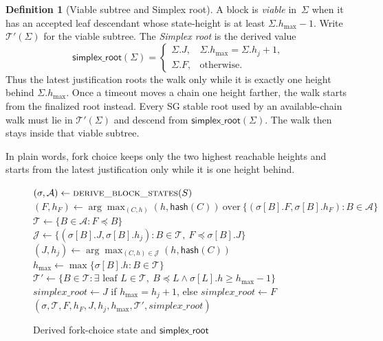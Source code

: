 \ifx\litemode\undefined\documentclass{article}\fi
\theoremstyle{plain}
\theoremstyle{definition}
\newtheorem{definition}{Definition}
\theoremstyle{remark}
\newcommand{\T}{\mathcal{T}}
\newcommand{\viableTree}{\mathcal{T}'}
\newcommand{\hmax}{h_{\max}}
\newcommand{\simplexRoot}{\mathsf{simplex\_root}}
\begin{document}
\begin{definition}[Viable subtree and Simplex root]\label{def:finality-root}
A block is \emph{viable} in~\(\Sigma\) when it has an accepted leaf descendant
whose state-height is at least \(\Sigma.\hmax-1\).  Write
\(\viableTree(\Sigma)\) for the viable subtree.  The \emph{Simplex root}
is the derived value
\[
  \simplexRoot(\Sigma)=
  \begin{cases}
    \Sigma.J,&\Sigma.\hmax=\Sigma.h_j+1,\\
    \Sigma.F,&\text{otherwise}.
  \end{cases}
\]
Thus the latest justification roots the walk only while it is exactly one
height behind \(\Sigma.\hmax\).  Once a timeout moves a chain one height
farther, the walk starts from the finalized root instead.
Every SG stable root used by an available-chain walk must lie in
\(\viableTree(\Sigma)\) and descend from \(\simplexRoot(\Sigma)\).  The walk
then stays inside that viable subtree.

In plain words, fork choice keeps only the two highest reachable heights and
starts from the latest justification only while it is one height behind.
\end{definition}

\begin{figure}[H]
\caption{Derived fork-choice state and \(\mathsf{simplex\_root}\)}
\label{alg:fork-choice-state}
\begin{center}
\begin{boxedminipage}{\textwidth}
\footnotesize
\begin{algorithmic}[1]
  \State \((\sigma,\mathcal A)\gets\Call{derive\_block\_states}{S}\)
  \State \((F,h_F)\gets
    \arg\max_{(C,h)}(h,\mathsf{hash}(C))\ \text{over}\
    \{(\sigma[B].F,\sigma[B].h_F):B\in\mathcal A\}\)
  \State \(\T\gets\{B\in\mathcal A:F\preceq B\}\)
  \State \(\mathcal J\gets
    \{(\sigma[B].J,\sigma[B].h_j):B\in\T,\
      F\preceq\sigma[B].J\}\)
  \State \((J,h_j)\gets
    \arg\max_{(C,h)\in\mathcal J}(h,\mathsf{hash}(C))\)
  \State \(\hmax\gets\max\{\sigma[B].h:B\in\T\}\)
  \State \(\viableTree\gets
    \{B\in\T:\exists\text{ leaf }L\in\T,\
      B\preceq L\land\sigma[L].h\geq\hmax-1\}\)
  \State \(\mathit{simplex\_root}\gets J\) if \(\hmax=h_j+1\), else
    \(\mathit{simplex\_root}\gets F\)
  \State \Return
    \((\sigma,\T,F,h_F,J,h_j,\hmax,\viableTree,
      \mathit{simplex\_root})\)
\EndFunction
\end{algorithmic}
\end{boxedminipage}
\end{center}
\end{figure}
\end{document}
